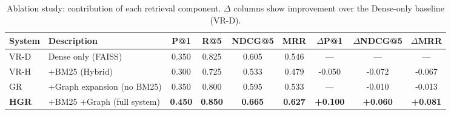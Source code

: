 \begin{table}[t]
\centering
\caption{Ablation study: contribution of each retrieval component.
$\Delta$ columns show improvement over the Dense-only baseline (VR-D).}
\label{tab:ablation}
\begin{tabular}{llccccccc}
\toprule
System & Description & P@1 & R@5 & NDCG@5 & MRR & $\Delta$P@1 & $\Delta$NDCG@5 & $\Delta$MRR \\
\midrule
VR-D & Dense only (FAISS) & 0.350 & 0.825 & 0.605 & 0.546 & — & — & — \\
VR-H & +BM25 (Hybrid) & 0.300 & 0.725 & 0.533 & 0.479 & -0.050 & -0.072 & -0.067 \\
GR & +Graph expansion (no BM25) & 0.350 & 0.800 & 0.595 & 0.533 & — & -0.010 & -0.013 \\
\textbf{HGR} & +BM25 +Graph (full system) & \textbf{0.450} & \textbf{0.850} & \textbf{0.665} & \textbf{0.627} & \textbf{+0.100} & \textbf{+0.060} & \textbf{+0.081} \\
\bottomrule
\end{tabular}
\end{table}
